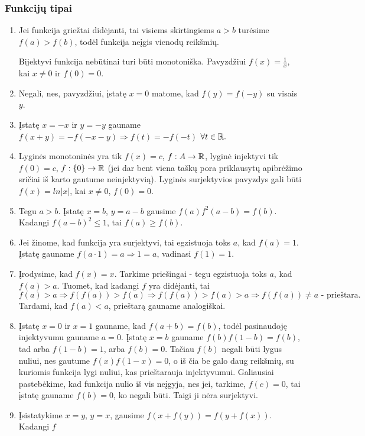 \subsubsection*{Funkcijų tipai}
\begin{enumerate}
\item
    Jei funkcija griežtai didėjanti, tai visiems skirtingiems $a>b$
    turėsime $f(a)>f(b)$, todėl funkcija neįgis vienodų reikšmių. 
    
    Bijektyvi funkcija nebūtinai turi būti monotoniška. Pavyzdžiui
    $f(x)=\frac{1}{x}$, kai $x\neq 0$ ir $f(0)=0$.
\item
    Negali, nes, pavyzdžiui, įstatę $x=0$ matome, kad $f(y)=f(-y)$ su visais $y$.
\item
    Įstatę $x=-x$ ir $y=-y$ gauname $f(x+y) = -f(-x-y)\Rightarrow
    f(t)=-f(-t)$ $\forall t \in \mathbb R.$
\item
    Lyginės monotoninės yra tik $f(x)=c$, $f:A\to \mathbb R$, lyginė injektyvi
    tik $f(0)=c$, $f:\{0\}\to \mathbb R$ (jei dar bent viena taškų pora
    priklausytų apibrėžimo sričiai iš karto gautume neinjektyvią). Lyginės
    surjektyvios pavyzdys gali būti $f(x)=ln|x|$, kai $x\neq 0$, $f(0)=0$.
\item
    Tegu $a>b$. Įstatę $x =b$, $y = a-b$ gausime $f(a)f^2(a-b)=f(b)$.
    Kadangi $f(a-b)^2\leq 1$, tai $f(a)\geq f(b)$.
\item
    Jei žinome, kad funkcija yra surjektyvi, tai egzistuoja toks $a$, kad
    $f(a)=1$. Įstatę gauname $f(a\cdot 1) =a \Rightarrow 1 = a$, vadinasi
    $f(1)=1$.
\item
    Įrodysime, kad $f(x)=x$. Tarkime priešingai - tegu egzistuoja toks
    $a$, kad $f(a)>a$. Tuomet, kad kadangi $f$ yra didėjanti, tai $$f(a)>a
    \Rightarrow f(f(a))>f(a) \Rightarrow f(f(a))>f(a)>a \Rightarrow
    f(f(a))\neq a \text { - prieštara}.$$ Tardami, kad $f(a)<a$, prieštarą
    gauname analogiškai.
\item
    Įstatę $x=0$ ir $x=1$ gauname, kad $f(a+b)=f(b)$, todėl pasinaudoję injektyvumu gauname $a = 0$.
    Įstatę $x=b$ gauname $f(b)f(1-b)=f(b)$, tad arba $f(1-b)=1$, arba
    $f(b)=0$. Tačiau $f(b)$ negali būti lygus nuliui, nes gautume
    $f(x)f(1-x)=0$, o iš čia be galo daug reikšmių, su kuriomis funkcija
    lygi nuliui, kas prieštarauja injektyvumui.
    Galiausiai pastebėkime, kad funkcija nulio iš vis neįgyja, nes jei,
    tarkime, $f(c)=0$, tai įstatę gauname $f(b)=0$, ko negali būti. Taigi
    ji nėra surjektyvi.
\item
    Įsistatykime $x=y$, $y=x$, gausime $f(x+f(y))=f(y+f(x))$. Kadangi $f$

\end{enumerate}
